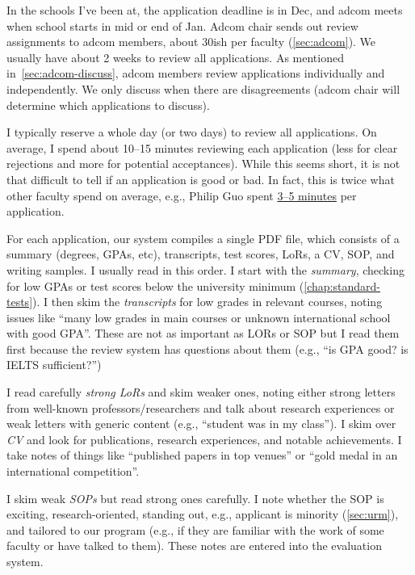 \documentclass[oneside,11pt,dvipsnames]{book}
\begin{document}
In the schools I've been at, the application deadline is in Dec, and adcom meets when school starts in mid or end of Jan. Adcom chair sends out review assignments to adcom members, about 30ish per faculty (\autoref{sec:adcom}). We usually have about 2 weeks to review all applications. As mentioned in~\autoref{sec:adcom-discuss}, adcom members review applications individually and independently. We only discuss when there are disagreements (adcom chair will determine which applications to discuss).

I typically reserve a whole day (or two days) to review all applications.
On average, I spend about 10--15 minutes reviewing each application (less for clear rejections and more for potential acceptances). While this seems short, it is not that difficult to tell if an application is good or bad.  In fact, this
is twice what other faculty spend on average, e.g., Philip Guo spent \href{https://pg.ucsd.edu/PhD-application-tips.htm}{3--5 minutes} per application.

For each application, our system compiles a single PDF file, which consists of a summary (degrees, GPAs, etc), transcripts, test scores, LoRs, a CV, SOP, and writing samples. I usually read in this order. I start with the \emph{summary}, checking for low GPAs or test scores below the university minimum (\autoref{chap:standard-tests}). I then skim the \emph{transcripts} for low grades in relevant courses, noting issues like ``many low grades in main courses or unknown international school with good GPA''.  These are not as important as LORs or SOP but I read them first because the review system has questions about them (e.g., ``is GPA good? is IELTS sufficient?'')

I read carefully \emph{strong LoRs} and skim weaker ones, noting either strong letters from well-known professors/researchers and talk about research experiences or weak letters with generic content (e.g., ``student was in my class''). I skim over \emph{CV} and look for publications, research experiences, and notable achievements. I take notes of things like ``published papers in top venues'' or ``gold medal in an international competition''.

I skim weak \emph{SOPs} but read strong ones carefully. I note whether the SOP is exciting, research-oriented, standing out, e.g., applicant is minority (\autoref{sec:urm}), and tailored to our program (e.g., if they are familiar with the work of some faculty or have talked to them). These notes are entered into the evaluation system.
\end{document}
